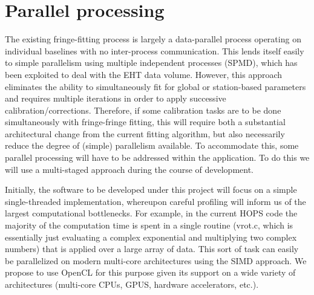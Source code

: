 
\section{Parallel processing}
\label{sec:parallel}

The existing fringe-fitting process is largely a data-parallel process operating on individual baselines with no inter-process
communication. This lends itself easily to simple parallelism using multiple independent processes (SPMD), which has been exploited
\cite{blackburn2019eht} to deal with the EHT data volume. However, this approach eliminates the ability to simultaneously fit for global or station-based
parameters and requires multiple iterations in order to apply successive calibration/corrections. Therefore, if some calibration tasks are to be
done simultaneously with fringe-fringe fitting, this will require both a substantial architectural change from the current fitting algorithm, but
also necessarily reduce the degree of (simple) parallelism available. To accommodate this, some parallel processing will have to be addressed
within the application. To do this we will use a multi-staged approach during the course of development.

Initially, the software to be developed under this project will focus on a simple single-threaded implementation, whereupon careful
profiling will inform us of the largest computational bottlenecks. For example, in the current HOPS code the majority of
the computation time is spent in a single routine (vrot.c, which is essentially just evaluating a complex exponential and multiplying two complex numbers) that is applied over
a large array of data. This sort of task can easily be parallelized on modern multi-core architectures using the SIMD approach. We propose to use OpenCL
for this purpose given its support on a wide variety of architectures (multi-core CPUs, GPUS, hardware accelerators, etc.).

